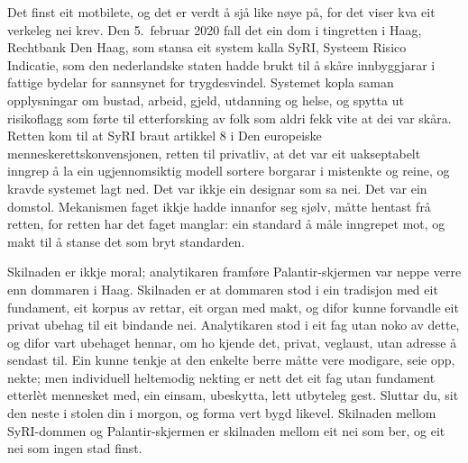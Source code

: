 Det finst eit motbilete, og det er verdt å sjå like nøye på, for det viser kva eit verkeleg nei krev. Den 5.\ februar 2020 fall det ein dom i tingretten i Haag, Rechtbank Den Haag, som stansa eit system kalla SyRI, Systeem Risico Indicatie, som den nederlandske staten hadde brukt til å skåre innbyggjarar i fattige bydelar for sannsynet for trygdesvindel. Systemet kopla saman opplysningar om bustad, arbeid, gjeld, utdanning og helse, og spytta ut risikoflagg som førte til etterforsking av folk som aldri fekk vite at dei var skåra. Retten kom til at SyRI braut artikkel 8 i Den europeiske menneskerettskonvensjonen, retten til privatliv, at det var eit uakseptabelt inngrep å la ein ugjennomsiktig modell sortere borgarar i mistenkte og reine, og kravde systemet lagt ned. Det var ikkje ein designar som sa nei. Det var ein domstol. Mekanismen faget ikkje hadde innanfor seg sjølv, måtte hentast frå retten, for retten har det faget manglar: ein standard å måle inngrepet mot, og makt til å stanse det som bryt standarden.

Skilnaden er ikkje moral; analytikaren framføre Palantir-skjermen var neppe verre enn dommaren i Haag. Skilnaden er at dommaren stod i ein tradisjon med eit fundament, eit korpus av rettar, eit organ med makt, og difor kunne forvandle eit privat ubehag til eit bindande nei. Analytikaren stod i eit fag utan noko av dette, og difor vart ubehaget hennar, om ho kjende det, privat, veglaust, utan adresse å sendast til. Ein kunne tenkje at den enkelte berre måtte vere modigare, seie opp, nekte; men individuell heltemodig nekting er nett det eit fag utan fundament etterlèt mennesket med, ein einsam, ubeskytta, lett utbyteleg gest. Sluttar du, sit den neste i stolen din i morgon, og forma vert bygd likevel. Skilnaden mellom SyRI-dommen og Palantir-skjermen er skilnaden mellom eit nei som ber, og eit nei som ingen stad finst.

